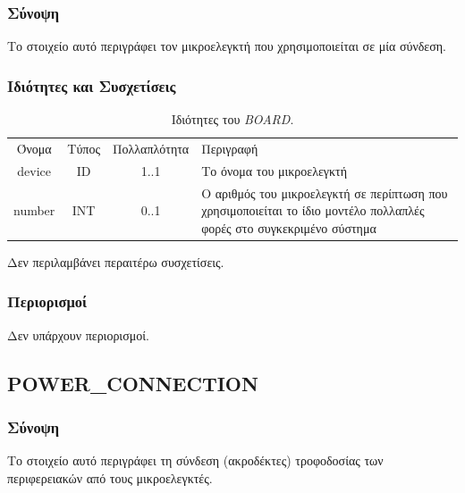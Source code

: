 \subsubsection*{Σύνοψη}

\noindent Το στοιχείο αυτό περιγράφει τον μικροελεγκτή που χρησιμοποιείται σε μία σύνδεση.

\subsubsection*{Ιδιότητες και Συσχετίσεις}

\begin{table}[H]
	\begin{center}
		\begin{tabular}{ | c | c | c| m{5.5cm} | }
			\hline
			\rowcolor{Gray}
			\multicolumn{4}{|c|}{\textbf{Ιδιότητες}}\\
			\hline
			\rowcolor{Gray}
			Όνομα & Τύπος & Πολλαπλότητα & Περιγραφή \\
			\hline
			device & ID & 1..1 & Το όνομα του μικροελεγκτή \\
			\hline
			number & INT & 0..1 & Ο αριθμός του μικροελεγκτή σε περίπτωση που χρησιμοποιείται το ίδιο μοντέλο πολλαπλές φορές στο συγκεκριμένο σύστημα \\
			\hline
		\end{tabular}
		\caption{Ιδιότητες του \textit{BOARD}.}
		\label{tab:board_con}
	\end{center}
\end{table}

\noindent Δεν περιλαμβάνει περαιτέρω συσχετίσεις.

\subsubsection*{Περιορισμοί}

\noindent Δεν υπάρχουν περιορισμοί.

\subsection{POWER\_CONNECTION}
\label{subsec:power_connection}

\subsubsection*{Σύνοψη}

\noindent Το στοιχείο αυτό περιγράφει τη σύνδεση (ακροδέκτες) τροφοδοσίας των περιφερειακών από τους μικροελεγκτές.


